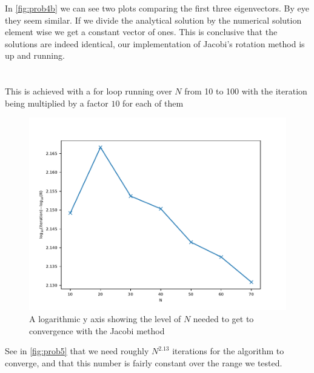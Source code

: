 \documentclass[a4paper,10pt,english]{article}
\begin{document}
            In \autoref{fig:prob4b} we can see two plots comparing the first three eigenvectors. By eye they
            seem similar. If we divide the analytical solution by the numerical solution element wise we get a
            constant vector of ones. This is conclusive that the solutions are indeed identical, our
            implementation of Jacobi's rotation method is up and running.

			
			\section{} %
			\subsection{}

			This is achieved with a for loop running over $N$ from 10 to 100 with the iteration being multiplied by a factor $10$ for each of them
			\begin{figure}[ht]
			  \centering
			  \includegraphics[width=1.0\linewidth]{figures/prob5.pdf}
			  \caption{A logarithmic y axis showing the level of $N$ needed to get to convergence with the Jacobi method\label{fig:prob5}}

			\end{figure}
			See in  \autoref{fig:prob5} that we need roughly $N^{2.13}$ iterations for the algorithm to converge,
			and that this number is fairly constant over the range we tested.
\end{document}
